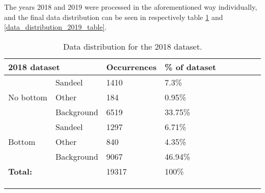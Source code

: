         The years 2018 and 2019 were processed in the aforementioned way individually, and the final data distribution can be seen in respectively table \ref{data_distribution_2018_table} and \ref{data_distribution_2019_table}.



\begin{longtable}{lllllllll}
\caption[2018 data distribution]{Data distribution for the 2018 dataset.}
\\ \cline{1-4}
\multicolumn{2}{|l|}{\textbf{2018 dataset}} & \multicolumn{1}{l|}{Occurrences} & \multicolumn{1}{l|}{\% of dataset} &  &  &  &  &  \\ \cline{1-4}
\endfirsthead
%
\endhead
%
                     & Sandeel              & 1410                             & 7.3\%                              &  &  &  &  &  \\
No bottom            & Other                & 184                              & 0.95\%                             &  &  &  &  &  \\
                     & Background           & 6519                             & 33.75\%                            &  &  &  &  &  \\ \cline{1-4}
                     & Sandeel              & 1297                             & 6.71\%                             &  &  &  &  &  \\
Bottom               & Other                & 840                              & 4.35\%                             &  &  &  &  &  \\
                     & Background           & 9067                             & 46.94\%                            &  &  &  &  &  \\ \cline{1-4}
\multicolumn{2}{l}{\textbf{Total:}}         & 19317                            & 100\%                              &  &  &  &  &  \\ \cline{1-4}
                     &                      &                                  &                                    &  &  &  &  &  \\
                     &                      &                                  &                                    &  &  &  &  & 
\\ \label{data_distribution_2018_table}
\end{longtable}

